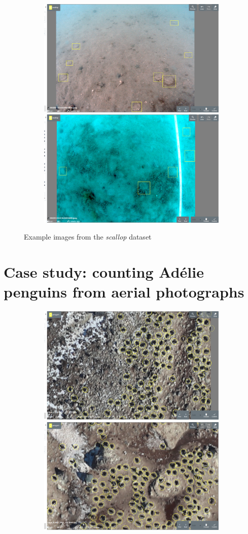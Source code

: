 \begin{figure}[h!]
\begin{subfigure}[t]{1.0\linewidth}
  \includegraphics[width=0.475\linewidth]{figures/annotation/screenshots/scallops.png}
  \hfill
  \includegraphics[width=0.475\linewidth]{figures/annotation/screenshots/scallops3.png}
\end{subfigure}

\caption{Example images from the \emph{scallop} dataset}
\label{fig:scallop_dataset}  

\end{figure}



\section{Case study: counting Adélie penguins from aerial photographs}

\begin{figure}[h!]
\centering
\begin{subfigure}[t]{1.0\linewidth}
  \includegraphics[width=0.475\linewidth]{figures/annotation/screenshots/penguins_aerial.png}
  \hfill
  \includegraphics[width=0.475\linewidth]{figures/annotation/screenshots/penguins_aerial2.png}
  \caption{}
\end{subfigure}

\caption{ }
\label {fig:penguin_aerial_examples}
\end{figure}

